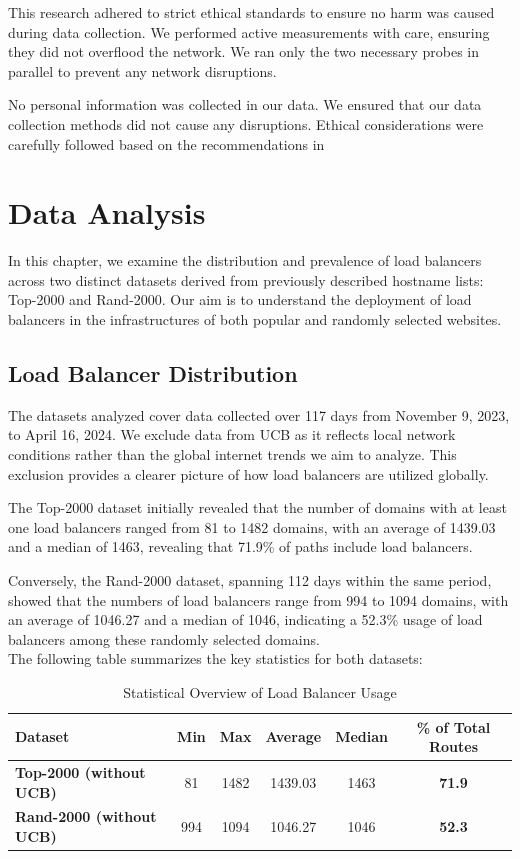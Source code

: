 \documentclass[12pt]{cwru_thesis}
\begin{document}
This research adhered to strict ethical standards to ensure no harm was caused during data collection. We performed active measurements with care, ensuring they did not overflood the network. We ran only the two necessary probes in parallel to prevent any network disruptions.

No personal information was collected in our data. We ensured that our data collection methods did not cause any disruptions. Ethical considerations were carefully followed based on the recommendations in  \cite{partridge2016ethical}



\chapter{Data Analysis}

In this chapter, we examine the distribution and prevalence of load balancers across two distinct datasets derived from previously described hostname lists: Top-2000 and Rand-2000. Our aim is to understand the deployment of load balancers in the infrastructures of both popular and randomly selected websites.

\section{Load Balancer Distribution}

The datasets analyzed cover data collected over 117 days from November 9, 2023, to April 16, 2024. We exclude data from UCB as it reflects local network conditions rather than the global internet trends we aim to analyze. This exclusion provides a clearer picture of how load balancers are utilized globally.

The Top-2000 dataset initially revealed that the number of domains with at least one load balancers ranged from 81 to 1482 domains, with an average of 1439.03 and a median of 1463, revealing that 71.9\% of paths include load balancers.

Conversely, the Rand-2000 dataset, spanning 112 days within the same period, showed that the numbers of load balancers range from 994 to 1094 domains, with an average of 1046.27 and a median of 1046, indicating a 52.3\% usage of load balancers among these randomly selected domains.\\

The following table summarizes the key statistics for both datasets:

\begin{table}[h]
\centering
\begin{tabular}{|l|c|c|c|c|c|}
\hline
\textbf{Dataset} & \textbf{Min} & \textbf{Max} & \textbf{Average} & \textbf{Median} &\textbf{\% of Total Routes}\\
\hline

\textbf{Top-2000 (without UCB)} & 81 & 1482 & 1439.03 & 1463 & \textbf{71.9} \\
\textbf{Rand-2000 (without UCB)} & 994 & 1094 & 1046.27 & 1046 & \textbf{52.3}  \\
\hline
\end{tabular}
\caption{Statistical Overview of Load Balancer Usage}
\label{tab:stats_overview}
\end{table}
\end{document}
